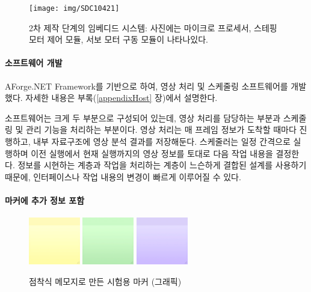 \documentclass[chapter,11pt,oneside,openany]{xoblivoir}
\begin{document}
\begin{figure}[ht]
\centering
\texttt{[image: img/SDC10421]}
\caption[2차 제작 단계의 임베디드 시스템]{2차 제작 단계의 임베디드 시스템: 사진에는 마이크로 프로세서, 스테핑 모터 제어 모듈, 서보 모터 구동 모듈이 나타나있다.}
\label{img:embedded2}
\end{figure}

\paragraph{소프트웨어 개발}
AForge.NET Framework를 기반으로 하여, 영상 처리 및 스케줄링 소프트웨어를 개발했다. 자세한 내용은 부록(\ref{appendixHost} 장)에서 설명한다.

소프트웨어는 크게 두 부분으로 구성되어 있는데, 영상 처리를 담당하는 부분과
스케줄링 및 관리 기능을 처리하는 부분이다.
영상 처리는 매 프레임 정보가 도착할 때마다 진행하고,
내부 자료구조에 영상 분석 결과를 저장해둔다.
스케줄러는 일정 간격으로 실행하며 이전 실행에서 현재 실행까지의 영상 정보를 토대로
다음 작업 내용을 결정한다. 정보를 시현하는 계층과 작업을 처리하는 계층이 느슨하게 결합된 설계를 사용하기 때문에, 인터페이스나 작업 내용의 변경이 빠르게 이루어질 수 있다.


\paragraph{마커에 추가 정보 포함}

\begin{figure}[ht]
\centering
\includegraphics[width=0.2\textwidth]{img/pYellow}
\hspace{0.4cm}
\includegraphics[width=0.2\textwidth]{img/pGreen}
\hspace{0.4cm}
\includegraphics[width=0.2\textwidth]{img/pPurple}

\caption{점착식 메모지로 만든 시험용 마커 (그래픽)}
\label{img:pMarker}
\end{figure}
\end{document}
